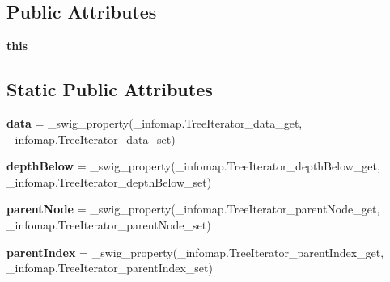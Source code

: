 \subsection*{Public Attributes}
\begin{DoxyCompactItemize}
\item 
\mbox{\label{classdsmacc_1_1graph_1_1infomap_1_1TreeIterator_aa15a616c8efc1a5ad5d949a32adb939b}} 
{\bfseries this}
\end{DoxyCompactItemize}
\subsection*{Static Public Attributes}
\begin{DoxyCompactItemize}
\item 
\mbox{\label{classdsmacc_1_1graph_1_1infomap_1_1TreeIterator_a04e0394d8fdaf46786f4c280264ab91e}} 
{\bfseries data} = \+\_\+swig\+\_\+property(\+\_\+infomap.\+Tree\+Iterator\+\_\+data\+\_\+get, \+\_\+infomap.\+Tree\+Iterator\+\_\+data\+\_\+set)
\item 
\mbox{\label{classdsmacc_1_1graph_1_1infomap_1_1TreeIterator_a19fc8ec091f7412e2d931e52676cc8f4}} 
{\bfseries depth\+Below} = \+\_\+swig\+\_\+property(\+\_\+infomap.\+Tree\+Iterator\+\_\+depth\+Below\+\_\+get, \+\_\+infomap.\+Tree\+Iterator\+\_\+depth\+Below\+\_\+set)
\item 
\mbox{\label{classdsmacc_1_1graph_1_1infomap_1_1TreeIterator_ab0cf18c9c6dfb119d4c5d40867ecf06a}} 
{\bfseries parent\+Node} = \+\_\+swig\+\_\+property(\+\_\+infomap.\+Tree\+Iterator\+\_\+parent\+Node\+\_\+get, \+\_\+infomap.\+Tree\+Iterator\+\_\+parent\+Node\+\_\+set)
\item 
\mbox{\label{classdsmacc_1_1graph_1_1infomap_1_1TreeIterator_a6fe442cd5ca637018764b14dce6863f3}} 
{\bfseries parent\+Index} = \+\_\+swig\+\_\+property(\+\_\+infomap.\+Tree\+Iterator\+\_\+parent\+Index\+\_\+get, \+\_\+infomap.\+Tree\+Iterator\+\_\+parent\+Index\+\_\+set)
\item 
\mbox{\label{classdsmacc_1_1graph_1_1infomap_1_1TreeIterator_a12b6a169db585eac8f6547dbb804b55d}} 

\end{DoxyCompactItemize}
